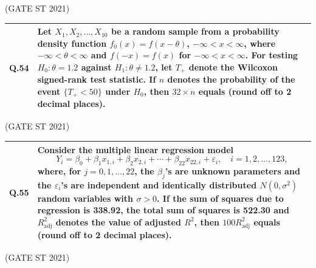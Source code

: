 \documentclass[journal,12pt,onecolumn]{IEEEtran}
\theoremstyle{remark}
\begin{document}
\bigskip
\hfill (GATE ST 2021)
\\
\begin{tabular}{|p{1cm}|p{14cm}|}
\hline
\textbf{Q.54} &
Let $X_1, X_2, \ldots, X_{10}$ be a random sample from a probability density function $f_0(x) = f(x - \theta)$, $-\infty < x < \infty$, where $-\infty < \theta < \infty$ and $f(-x) = f(x)$ for $-\infty < x < \infty$. For testing $H_0: \theta = 1.2$ against $H_1: \theta \neq 1.2$, let $T_+$ denote the Wilcoxon signed-rank test statistic. If $n$ denotes the probability of the event $\{T_+ < 50\}$ under $H_0$, then $32 \times n$ equals (round off to 2 decimal places).\\
\hline
\end{tabular}

\bigskip
\hfill (GATE ST 2021)
\\
\begin{tabular}{|p{1cm}|p{14cm}|}
\hline
\textbf{Q.55} &
Consider the multiple linear regression model
$$
Y_i = \beta_0 + \beta_1 x_{1,i} + \beta_2 x_{2,i} + \cdots + \beta_{22} x_{22,i} + \varepsilon_i, \quad i=1, 2, \ldots, 123,
$$
where, for $j=0, 1, \ldots, 22$, the $\beta_j$'s are unknown parameters and the $\varepsilon_i$'s are independent and identically distributed $N(0, \sigma^2)$ random variables with $\sigma > 0$. If the sum of squares due to regression is 338.92, the total sum of squares is 522.30 and $R^2_{\text{adj}}$ denotes the value of adjusted $R^2$, then $100 R^2_{\text{adj}}$ equals (round off to 2 decimal places).\\
\hline
\end{tabular}

\bigskip
\hfill (GATE ST 2021)
\\
\end{document}
